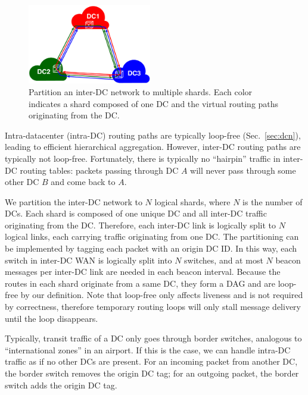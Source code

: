 \begin{figure}[t]
\centering
\includegraphics[width=0.48\textwidth]{images/inter-DC.pdf}
\caption{
	Partition an inter-DC network to multiple shards.
	Each color indicates a shard composed of one DC and the virtual routing paths originating from the DC.
}
\label{fig:inter-dc}
\end{figure}



Intra-datacenter (intra-DC) routing paths are typically loop-free (Sec.~\ref{sec:dcn}), leading to efficient hierarchical aggregation.
However, inter-DC routing paths are typically not loop-free.
Fortunately, there is typically no ``hairpin'' traffic in inter-DC routing tables: packets passing through DC $A$ will never pass through some other DC $B$ and come back to $A$.

We partition the inter-DC network to $N$ logical shards, where $N$ is the number of DCs.
Each shard is composed of one unique DC and all inter-DC traffic originating from the DC.
Therefore, each inter-DC link is logically split to $N$ logical links, each carrying traffic originating from one DC.
The partitioning can be implemented by tagging each packet with an origin DC ID.
In this way, each switch in inter-DC WAN is logically split into $N$ switches, and at most $N$ beacon messages per inter-DC link are needed in each beacon interval.
Because the routes in each shard originate from a same DC, they form a DAG and are loop-free by our definition.
Note that loop-free only affects liveness and is not required by correctness, therefore temporary routing loops will only stall message delivery until the loop disappears.

Typically, transit traffic of a DC only goes through border switches, analogous to ``international zones'' in an airport.
If this is the case, we can handle intra-DC traffic as if no other DCs are present.
For an incoming packet from another DC, the border switch removes the origin DC tag; for an outgoing packet, the border switch adds the origin DC tag.
\fi
